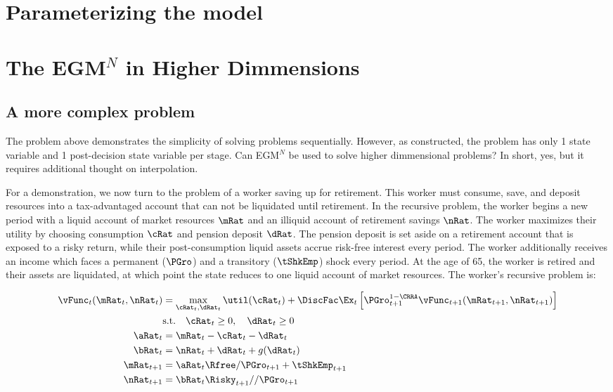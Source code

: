 \documentclass[\econtexRoot/EGMN]{subfiles}
\begin{document}
\hypertarget{parameterizing-the-model}{}\par\section{Parameterizing the model}

\section{The EGM$^N$ in Higher Dimmensions}

\subsection{A more complex problem}

The problem above demonstrates the simplicity of solving problems sequentially. However, as constructed, the problem has only 1 state variable and 1 post-decision state variable per stage. Can EGM$^N$ be used to solve higher dimmensional problems? In short, yes, but it requires additional thought on interpolation.

For a demonstration, we now turn to the problem of a worker saving up for retirement. This worker must consume, save, and deposit resources into a tax-advantaged account that can not be liquidated until retirement. In the recursive problem, the worker begins a new period with a liquid account of market resources $\mRat$ and an illiquid account of retirement savings $\nRat$. The worker maximizes their utility by choosing consumption $\cRat$ and pension deposit $\dRat$. The pension deposit is set aside on a retirement account that is exposed to a risky return, while their post-consumption liquid assets accrue risk-free interest every period. The worker additionally receives an income which faces a permanent ($\PGro$) and a transitory ($\tShkEmp$) shock every period. At the age of 65, the worker is retired and their assets are liquidated, at which point the state reduces to one liquid account of market resources. The worker's recursive problem is:

\providecommand{\lRat}{\ensuremath{l}}

\begin{equation}
    \begin{split}
        \vFunc_{t}(\mRat_{t}, \nRat_{t}) & = \max_{\cRat_{t}, \dRat_{t}} \util(\cRat_{t}) + \DiscFac \Ex_{t} \left[ \PGro_{t+1}^{1-\CRRA} \vFunc_{t+1}(\mRat_{t+1}, \nRat_{t+1}) \right] \\
        & \text{s.t.} \quad \cRat_{t} \ge 0, \quad \dRat_{t} \ge 0 \\
        \aRat_{t} & = \mRat_{t} - \cRat_{t} - \dRat_{t} \\
        \bRat_{t} & = \nRat_{t} + \dRat_{t} + g(\dRat_{t}) \\
        \mRat_{t+1} & = \aRat_{t} \Rfree / \PGro_{t+1}  + \tShkEmp_{t+1} \\
        \nRat_{t+1} & = \bRat_{t} \Risky_{t+1} / / \PGro_{t+1}
    \end{split}
\end{equation}
\end{document}
